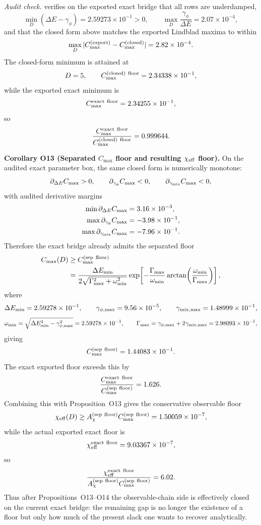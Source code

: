 \documentclass[aps,prd,onecolumn,notitlepage,nofootinbib,superscriptaddress,11pt,floatfix]{revtex4-2}
\begin{document}
\textit{Audit check.}  verifies on the exported exact bridge that all rows are underdamped,
\[
\min_D(\Delta E-\gamma_\phi)=2.59273\times10^{-1}>0,
\qquad
\max_D \frac{\gamma_\phi}{\Delta E}=2.07\times10^{-4},
\]
and that the closed form above matches the exported Lindblad maxima to within
\[
\max_D |C_{\max}^{\rm(export)}-C_{\max}^{\rm(closed)}|
=2.82\times10^{-4}.
\]
The closed-form minimum is attained at
\[
D=5,
\qquad
C_{\max}^{\rm(closed)\ floor}=2.34338\times10^{-1},
\]
while the exported exact minimum is
\[
C_{\max}^{\rm exact\ floor}=2.34255\times10^{-1},
\]
so
\[
\frac{C_{\max}^{\rm exact\ floor}}{C_{\max}^{\rm(closed)\ floor}}=0.999644.
\]

\medskip\noindent\textbf{Corollary O13 (Separated \texorpdfstring{$C_{\max}$}{Cmax} floor and resulting \texorpdfstring{$\chi_{\rm eff}$}{chi_eff} floor).}
On the audited exact parameter box, the same closed form is numerically monotone:
\[
\partial_{\Delta E} C_{\max}>0,
\qquad
\partial_{\gamma_\phi} C_{\max}<0,
\qquad
\partial_{\gamma_{\rm mix}} C_{\max}<0,
\]
with audited derivative margins
\[
\begin{aligned}
\min \partial_{\Delta E} C_{\max}&=3.16\times10^{-3},\\
\max \partial_{\gamma_\phi} C_{\max}&=-3.98\times10^{-1},\\
\max \partial_{\gamma_{\rm mix}} C_{\max}&=-7.96\times10^{-1}.
\end{aligned}
\]
Therefore the exact bridge already admits the separated floor
\[
\begin{aligned}
C_{\max}(D)&\ge C_{\max}^{\rm(sep\ floor)}\\
&=
\frac{\Delta E_{\min}}
{2\sqrt{\Gamma_{\max}^2+\omega_{\min}^2}}
\exp\!\left[
-\frac{\Gamma_{\max}}{\omega_{\min}}
\arctan\!\left(\frac{\omega_{\min}}{\Gamma_{\max}}\right)
\right],
\end{aligned}
\]
where
\[
\Delta E_{\min}=2.59278\times10^{-1},
\qquad
\gamma_{\phi,\max}=9.56\times10^{-5},
\qquad
\gamma_{{\rm mix},\max}=1.48999\times10^{-1},
\]
\[
\omega_{\min}=\sqrt{\Delta E_{\min}^2-\gamma_{\phi,\max}^2}=2.59278\times10^{-1},
\qquad
\Gamma_{\max}=\gamma_{\phi,\max}+2\gamma_{{\rm mix},\max}=2.98093\times10^{-1},
\]
giving
\[
C_{\max}^{\rm(sep\ floor)}=1.44083\times10^{-1}.
\]
The exact exported floor exceeds this by
\[
\frac{C_{\max}^{\rm exact\ floor}}{C_{\max}^{\rm(sep\ floor)}}=1.626.
\]
Combining this with Proposition~O13 gives the conservative observable floor
\[
\chi_{\rm eff}(D)\ge
A_\chi^{\rm(sep\ floor)} C_{\max}^{\rm(sep\ floor)}
=1.50059\times10^{-7},
\]
while the actual exported exact floor is
\[
\chi_{\rm eff}^{\rm exact\ floor}=9.03367\times10^{-7},
\]
so
\[
\frac{\chi_{\rm eff}^{\rm exact\ floor}}
{A_\chi^{\rm(sep\ floor)} C_{\max}^{\rm(sep\ floor)}}
=6.02.
\]
Thus after Propositions~O13--O14 the observable-chain side is effectively closed on the current exact bridge: the remaining gap is no longer the existence of a floor but only how much of the present slack one wants to recover analytically.
\end{document}
